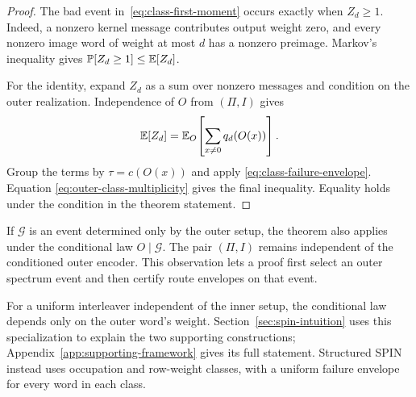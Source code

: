\begin{proof}
The bad event in~\eqref{eq:class-first-moment} occurs exactly when
$Z_d\ge1$. Indeed, a nonzero kernel message contributes output weight zero,
and every nonzero image word of weight at most $d$ has a nonzero preimage.
Markov's inequality gives $\mathbb P[Z_d\ge1]\le\mathbb E[Z_d]$.

For the identity, expand $Z_d$ as a sum over nonzero messages and condition
on the outer realization. Independence of $O$ from $(\Pi,I)$ gives
\[
  \mathbb E[Z_d]
  =
  \mathbb E_O\!\left[
    \sum_{x\ne0}q_d(O(x))
  \right].
\]
Group the terms by $\tau=c(O(x))$ and apply
\eqref{eq:class-failure-envelope}. Equation
\eqref{eq:outer-class-multiplicity} gives the final inequality. Equality holds
under the condition in the theorem statement.
\end{proof}

If $\mathcal G$ is an event determined only by the outer setup, the theorem
also applies under the conditional law $O\mid\mathcal G$. The pair $(\Pi,I)$
remains independent of the conditioned outer encoder. This observation lets a
proof first select an outer spectrum event and then certify route envelopes on
that event.

For a uniform interleaver independent of the inner setup, the conditional
law depends only on the outer word's weight. Section~\ref{sec:spin-intuition}
uses this specialization to explain the two supporting constructions;
Appendix~\ref{app:supporting-framework} gives its full statement.
Structured SPIN instead uses occupation and row-weight classes, with a
uniform failure envelope for every word in each class.
